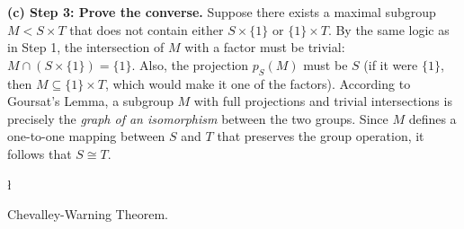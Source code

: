 \begin{solution}
\textbf{(c) Step 3: Prove the converse.}
Suppose there exists a maximal subgroup $M < S \times T$ that does not contain either $S \times \{1\}$ or $\{1\} \times T$.
By the same logic as in Step 1, the intersection of $M$ with a factor must be trivial: $M \cap (S \times \{1\}) = \{1\}$.
Also, the projection $p_S(M)$ must be $S$ (if it were $\{1\}$, then $M \subseteq \{1\} \times T$, which would make it one of the factors).
According to Goursat's Lemma, a subgroup $M$ with full projections and trivial intersections is precisely the \textit{graph of an isomorphism} between the two groups.
Since $M$ defines a one-to-one mapping between $S$ and $T$ that preserves the group operation, it follows that $S \cong T$.
\end{solution}

\begin{exercise}
\l\label{2014:5}

\label{algebra:2014:5}Chevalley-Warning Theorem.
\end{exercise}

